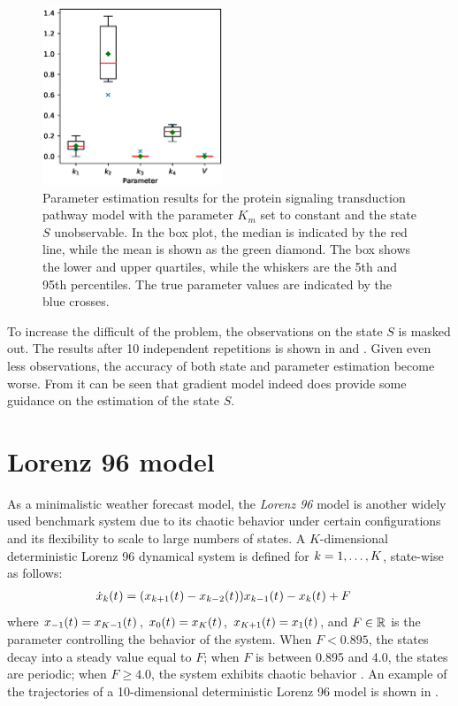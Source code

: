 \begin{figure}
    \centering
    \includegraphics[width=0.48\textwidth]{graphics/protein-parameters-partial-without-km}
    \caption{Parameter estimation results for the protein signaling transduction pathway model with the parameter $K_m$ set to constant and the state $S$ unobservable. In the box plot, the median is indicated by the red line, while the mean is shown as the green diamond. The box shows the lower and upper quartiles, while the whiskers are the 5th and 95th percentiles. The true parameter values are indicated by the blue crosses.}
    \label{fig-protein-parameters-partial-without-km}
\end{figure}

To increase the difficult of the problem, the observations on the state $S$ is masked out.
The results after 10 independent repetitions is shown in  and .
Given even less observations, the accuracy of both state and parameter estimation become worse.
From  it can be seen that gradient model indeed does provide some guidance on the estimation of the state $S$.

\section{Lorenz 96 model}
\label{sec-lorenz-96}

As a minimalistic weather forecast model, the \emph{Lorenz 96} model \citep{lorenz1996predictability} is another widely used benchmark system due to its chaotic behavior under certain configurations and its flexibility to scale to large numbers of states.
A $K$-dimensional deterministic Lorenz 96 dynamical system is defined for $k = 1,\dots,K$, state-wise as follows:
\begin{align}
    \dot{x}_{k}(t_{})
     & = (x_{k+1}(t_{}) - x_{k-2}(t_{}))x_{k-1}(t_{}) - x_{k}(t_{}) + F
    \label{eq-lorenz-96-drift}
\end{align}
where $x_{-1}(t_{}) = x_{K-1}(t_{})$, $x_{0}(t_{}) = x_{K}(t_{})$, $x_{K+1}(t_{})=x_{1}(t_{})$, and $F \in \mathbb{R}$ is the parameter controlling the behavior of the system.
When $F < 0.895$, the states decay into a steady value equal to $F$; when $F$ is between 0.895 and 4.0, the states are periodic; when $F \geqslant 4.0$, the system exhibits chaotic behavior \citep{vrettas2015variational}.
An example of the trajectories of a 10-dimensional deterministic Lorenz 96 model is shown in .

